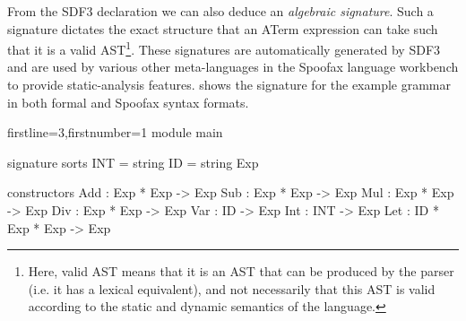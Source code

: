 
From the SDF3 declaration we can also deduce an \textit{algebraic signature}. Such a signature dictates the exact structure that an \ac{ATerm} expression can take such that it is a valid AST\footnote{Here, valid \ac{AST} means that it is an \ac{AST} that can be produced by the parser (i.e. it has a lexical equivalent), and not necessarily that this \ac{AST} is valid according to the static and dynamic semantics of the language.}. These signatures are automatically generated by SDF3 and are used by various other meta-languages in the Spoofax language workbench to provide static-analysis features.  shows the signature for the example grammar in both formal and Spoofax syntax formats.\\

\newsavebox{\sdfsignaturebox}
\begin{lrbox}{\sdfsignaturebox}\begin{minipage}{.45\textwidth}
\begin{statix*}{firstline=3,firstnumber=1}
module main

signature
  sorts
    INT = string
    ID = string
    Exp

  constructors
    Add : Exp * Exp -> Exp
    Sub : Exp * Exp -> Exp
    Mul : Exp * Exp -> Exp
    Div : Exp * Exp -> Exp
    Var : ID -> Exp
    Int : INT -> Exp
    Let : ID * Exp * Exp -> Exp
\end{statix*}
\end{minipage}
\end{lrbox}

